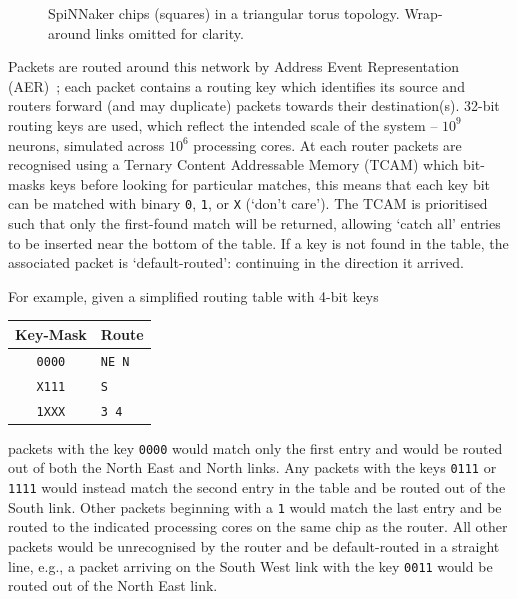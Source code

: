 \documentclass[conference]{IEEEtran}
\newcommand{\mytt}[1]{\texttt{\footnotesize#1}}
\begin{document}
\begin{figure}[!b]
  
  \center
  
  
  \caption{SpiNNaker chips (squares) in a triangular torus topology. Wrap-around links omitted for clarity.}
  \label{fig:diagrams/topology}
  
\end{figure}

Packets are routed around this network by Address Event Representation (AER)~\parencite{Boahen2000}; each packet contains a routing key which identifies its source and routers forward (and may duplicate) packets towards their destination(s).
32-bit routing keys are used, which reflect the intended scale of the system -- $10^9$ neurons, simulated across $10^6$ processing cores.
At each router packets are recognised using a Ternary Content Addressable Memory (TCAM) which bit-masks keys before looking for particular matches,
this means that each key bit can be matched with binary \mytt{0}, \mytt{1}, or \mytt{X} (`don't care').
The TCAM is prioritised such that only the first-found match will be returned, allowing `catch all' entries to be inserted near the bottom of the table.
If a key is not found in the table, the associated packet is `default-routed': continuing in the direction it arrived.

For example, given a simplified routing table with 4-bit keys

\begin{table}[H]
  \centering
  \begin{tabular}{c l}
    \toprule
    Key-Mask & Route \\
    \midrule
    \texttt{0000} & \texttt{NE N}\\
    \texttt{X111} & \texttt{S}\\
    \texttt{1XXX} & \texttt{3 4}\\
    \bottomrule
  \end{tabular}
\end{table}

\noindent packets with the key \mytt{0000} would match only the first entry and would be routed out of both the North East and North links.
Any packets with the keys \mytt{0111} or \mytt{1111} would instead match the second entry in the table and be routed out of the South link.
Other packets beginning with a \mytt{1} would match the last entry and be routed to the indicated processing cores on the same chip as the router.
All other packets would be unrecognised by the router and be default-routed in a straight line, e.g., a packet arriving on the South West link with the key \mytt{0011} would be routed out of the North East link.
\end{document}
